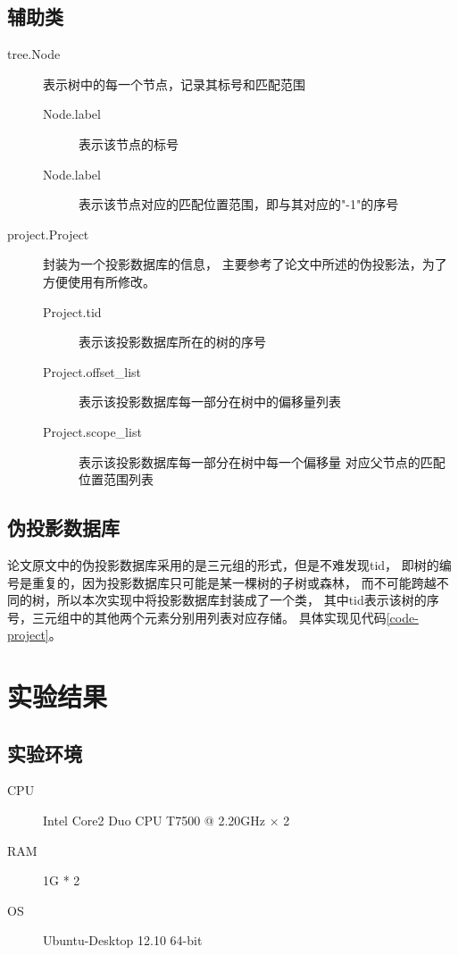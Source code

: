 \documentclass{ctexart}
\let\stdsection\section
\renewcommand\section{\newpage\stdsection}
\begin{document}
\subsection{辅助类}

\begin{description}
    \item[tree.Node] 表示树中的每一个节点，记录其标号和匹配范围
    \begin{description}
        \item[Node.label] 表示该节点的标号
        \item[Node.label] 表示该节点对应的匹配位置范围，即与其对应的"-1"的序号
    \end{description}
    \item[project.Project] 封装为一个投影数据库的信息，
        主要参考了论文中所述的伪投影法，为了方便使用有所修改。
    \begin{description}
        \item[Project.tid] 表示该投影数据库所在的树的序号
        \item[Project.offset\_list] 表示该投影数据库每一部分在树中的偏移量列表
        \item[Project.scope\_list] 表示该投影数据库每一部分在树中每一个偏移量
            对应父节点的匹配位置范围列表
    \end{description}
\end{description}

\subsection{伪投影数据库}

论文原文中的伪投影数据库采用的是三元组的形式，但是不难发现tid，
即树的编号是重复的，因为投影数据库只可能是某一棵树的子树或森林，
而不可能跨越不同的树，所以本次实现中将投影数据库封装成了一个类，
其中tid表示该树的序号，三元组中的其他两个元素分别用列表对应存储。
具体实现见代码\ref{code-project}。

\section{实验结果}

\subsection{实验环境}

\begin{description}
    \item[CPU] Intel\textsuperscript{\textregistered}
        Core\textsuperscript{\texttrademark}2 Duo CPU T7500 @ 2.20GHz × 2
    \item[RAM] 1G * 2
    \item[OS]  Ubuntu-Desktop 12.10 64-bit
\end{description}
\end{document}
